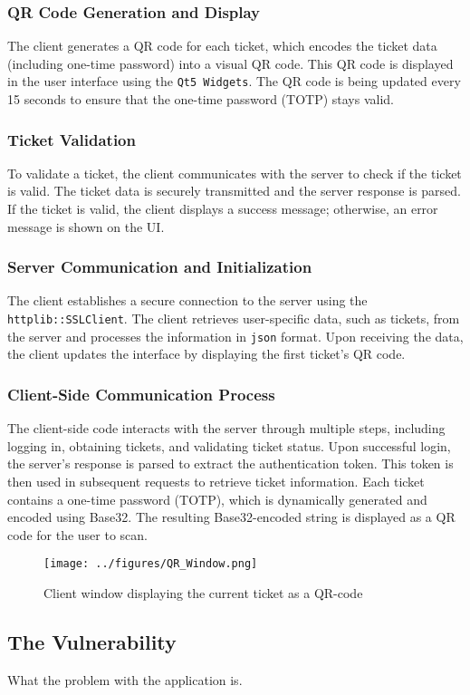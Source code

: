 \subsubsection{QR Code Generation and Display}
The client generates a QR code for each ticket, which encodes the ticket data (including one-time password) into a visual QR code. This QR code is displayed in the user interface using the \texttt{Qt5 Widgets}.
The QR code is being updated every 15 seconds to ensure that the one-time password (TOTP) stays valid.

\subsubsection{Ticket Validation}
To validate a ticket, the client communicates with the server to check if the ticket is valid. The ticket data is securely transmitted and the server response is parsed. If the ticket is valid, the client displays a success message; otherwise, an error message is shown on the UI.

\subsubsection{Server Communication and Initialization}
The client establishes a secure connection to the server using the \texttt{httplib::SSLClient}. The client retrieves user-specific data, such as tickets, from the server and processes the information in \texttt{json} format. Upon receiving the data, the client updates the interface by displaying the first ticket’s QR code.

\subsubsection{Client-Side Communication Process}
The client-side code interacts with the server through multiple steps, including logging in, obtaining tickets, and validating ticket status. Upon successful login, the server's response is parsed to extract the authentication token. This token is then used in subsequent requests to retrieve ticket information. Each ticket contains a one-time password (TOTP), which is dynamically generated and encoded using Base32. The resulting Base32-encoded string is displayed as a QR code for the user to scan.

\begin{figure}[H]
    \centering
    \texttt{[image: ../figures/QR\_Window.png]}
    \caption{Client window displaying the current ticket as a QR-code}
    \label{fig:WorkFlow1}
\end{figure}

\subsection{The Vulnerability}
What the problem with the application is.

